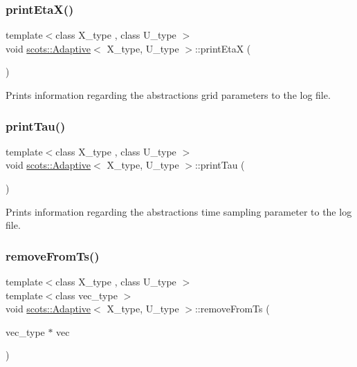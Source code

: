 \subsubsection{\texorpdfstring{print\+Eta\+X()}{printEtaX()}}
{\footnotesize\ttfamily template$<$class X\+\_\+type , class U\+\_\+type $>$ \\
void \hyperlink{classscots_1_1Adaptive}{scots\+::\+Adaptive}$<$ X\+\_\+type, U\+\_\+type $>$\+::print\+EtaX (\begin{DoxyParamCaption}{ }\end{DoxyParamCaption})\hspace{0.3cm}{\ttfamily [inline]}}

Prints information regarding the abstractions\textquotesingle{} grid parameters to the log file. \mbox{\label{classscots_1_1Adaptive_a7e3c0b5babfb943dcda7f7f5c89cbb3e}} 
\subsubsection{\texorpdfstring{print\+Tau()}{printTau()}}
{\footnotesize\ttfamily template$<$class X\+\_\+type , class U\+\_\+type $>$ \\
void \hyperlink{classscots_1_1Adaptive}{scots\+::\+Adaptive}$<$ X\+\_\+type, U\+\_\+type $>$\+::print\+Tau (\begin{DoxyParamCaption}{ }\end{DoxyParamCaption})\hspace{0.3cm}{\ttfamily [inline]}}

Prints information regarding the abstractions\textquotesingle{} time sampling parameter to the log file. \mbox{\label{classscots_1_1Adaptive_a47e3334958032965fa6218ad0c24ac02}} 
\subsubsection{\texorpdfstring{remove\+From\+Ts()}{removeFromTs()}}
{\footnotesize\ttfamily template$<$class X\+\_\+type , class U\+\_\+type $>$ \\
template$<$class vec\+\_\+type $>$ \\
void \hyperlink{classscots_1_1Adaptive}{scots\+::\+Adaptive}$<$ X\+\_\+type, U\+\_\+type $>$\+::remove\+From\+Ts (\begin{DoxyParamCaption}\item[{vec\+\_\+type $\ast$}]{vec }\end{DoxyParamCaption})\hspace{0.3cm}{\ttfamily [inline]}}

